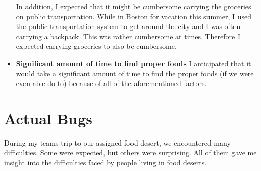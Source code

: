 \documentclass[11pt]{article}
\begin{document}
\begin{itemize}
        In addition, I expected that it might be cumbersome carrying the groceries on public
        transportation. While in Boston for vacation this summer, I used the public transportation
        system to get around the city and I was often carrying a backpack. This was rather
        cumbersome at times. Therefore I expected carrying groceries to also be cumbersome.

    \item \textbf{Significant amount of time to find proper foods} I anticipated that it would take
        a significant amount of time to find the proper foods (if we were even able do to) because
        of all of the aforementioned factors.
\end{itemize}

\section{Actual Bugs}
During my teams trip to our assigned food desert, we encountered many difficulties. Some were
expected, but others were surprising. All of them gave me insight into the difficulties faced by
people living in food deserts.
\end{document}
